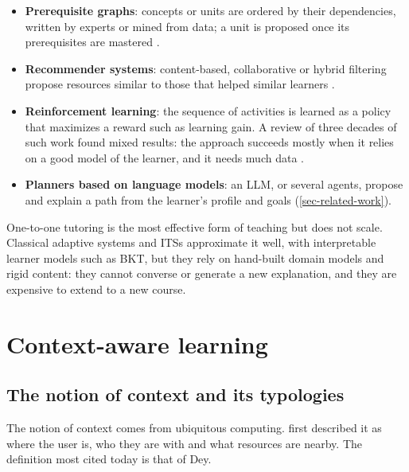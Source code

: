 \begin{itemize}
  \item \textbf{Prerequisite graphs}: concepts or units are ordered by
        their dependencies, written by experts or mined from data; a unit
        is proposed once its prerequisites are mastered
        \cite{doignon1999}.
  \item \textbf{Recommender systems}: content-based, collaborative or
        hybrid filtering propose resources similar to those that helped
        similar learners \cite{manouselis2011}.
  \item \textbf{Reinforcement learning}: the sequence of activities is
        learned as a policy that maximizes a reward such as learning gain.
        A review of three decades of such work found mixed results: the
        approach succeeds mostly when it relies on a good model of the
        learner, and it needs much data \cite{doroudi2019}.
  \item \textbf{Planners based on language models}: an LLM, or several
        agents, propose and explain a path from the learner's profile and
        goals \cite{wang2025genmentor,zeng2025graphmasal,xu2026malpp}
        (\cref{sec-related-work}).
\end{itemize}

\begin{summarybox}[Takeaway]
One-to-one tutoring is the most effective form of teaching but does not
scale. Classical adaptive systems and ITSs approximate it well, with
interpretable learner models such as BKT, but they rely on hand-built
domain models and rigid content: they cannot converse or generate a new
explanation, and they are expensive to extend to a new course.
\end{summarybox}

\section{Context-aware learning}
\label{sec-context}

\subsection{The notion of context and its typologies}
\label{subsec-context-def}

The notion of context comes from ubiquitous computing. \citet{schilit1994}
first described it as where the user is, who they are with and what
resources are nearby. The definition most cited today is that of Dey.

